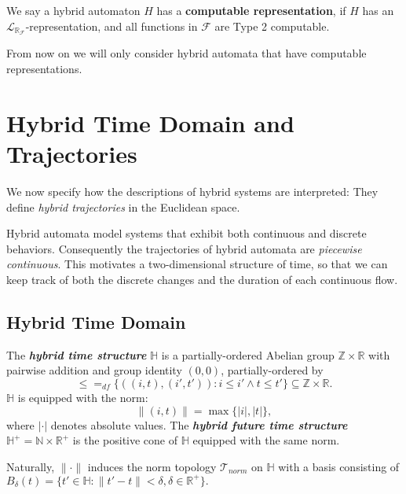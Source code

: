 \documentclass[envcountsect]{llncs}
\newcommand{\lrf}{\mathcal{L}_{\mathbb{R}_{\mathcal{F}}}}
\begin{document}
\begin{definition}
We say a hybrid automaton $H$ has a {\bf computable representation}, if $H$ has an $\lrf$-representation, and all functions in $\mathcal{F}$ are Type 2 computable. 
\end{definition}

From now on we will only consider hybrid automata that have computable representations. 

\section{Hybrid Time Domain and Trajectories}

We now specify how the descriptions of hybrid systems are interpreted: They define {\em hybrid trajectories} in the Euclidean space. 

Hybrid automata model systems that exhibit both continuous and discrete behaviors. Consequently the trajectories of hybrid automata are {\em piecewise continuous}. This motivates a two-dimensional structure of time, so that we can keep track of both the discrete changes and the duration of each continuous flow.  

\subsection{Hybrid Time Domain}

\begin{definition}
The {\bf\em hybrid time structure} $\mathbb{H}$ is a partially-ordered Abelian group $\mathbb{Z}\times\mathbb{R}$ with pairwise addition and group identity $(0,0)$, partially-ordered by $$\leq =_{df} \{ ((i,t),(i',t')) : i\leq i' \wedge t\leq t'\}\subseteq \mathbb{Z}\times\mathbb{R}.$$
 $\mathbb{H}$ is equipped with the norm: $$\|(i,t)\| = \max\{|i|,|t|\},$$
where $|\cdot|$ denotes absolute values. The {\bf\em hybrid future time structure} $\mathbb{H}^+=\mathbb{N}\times \mathbb{R}^+$ is the positive cone of $\mathbb{H}$ equipped with the same norm.
\end{definition}

\begin{remark}
Naturally, $\|\cdot\|$ induces the norm topology $\mathcal{T}_{norm}$ on $\mathbb{H}$ with a basis consisting of $B_{\delta}(t) = \{t'\in \mathbb{H}: \|t'-t\|<\delta, \delta\in \mathbb{R}^+\}.$
\end{remark}
\end{document}
